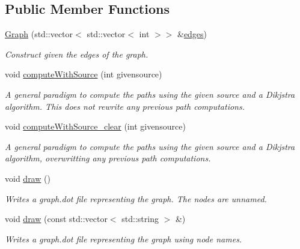 \subsection*{Public Member Functions}
\begin{DoxyCompactItemize}
\item 
\hyperlink{classMackey_1_1Graph_a979aefd7d97cd0344637180c00e7db1b}{Graph} (std\+::vector$<$ std\+::vector$<$ int $>$$>$ \&\hyperlink{classMackey_1_1Graph_a729ec24b9f9e504f4c4e2d3f6e2cab83}{edges})
\begin{DoxyCompactList}\small\item\em Construct given the edges of the graph. \end{DoxyCompactList}\item 
void \hyperlink{classMackey_1_1Graph_acda32cd8d144dcd1ec771bd8d2753321}{compute\+With\+Source} (int givensource)
\begin{DoxyCompactList}\small\item\em A general paradigm to compute the paths using the given source and a Dikjstra algorithm. This does not rewrite any previous path computations. \end{DoxyCompactList}\item 
void \hyperlink{classMackey_1_1Graph_a769966fd9422efb15a53db185a8be278}{compute\+With\+Source\+\_\+clear} (int givensource)
\begin{DoxyCompactList}\small\item\em A general paradigm to compute the paths using the given source and a Dikjstra algorithm, overwritting any previous path computations. \end{DoxyCompactList}\item 
void \hyperlink{classMackey_1_1Graph_ab88d38f2fa1822d415ce7dac272b32dc}{draw} ()
\begin{DoxyCompactList}\small\item\em Writes a graph.\+dot file representing the graph. The nodes are unnamed. \end{DoxyCompactList}\item 
void \hyperlink{classMackey_1_1Graph_a63aa485ca7838f3dc66da1749e09cd84}{draw} (const std\+::vector$<$ std\+::string $>$ \&)
\begin{DoxyCompactList}\small\item\em Writes a graph.\+dot file representing the graph using node names. \end{DoxyCompactList}\end{DoxyCompactItemize}
